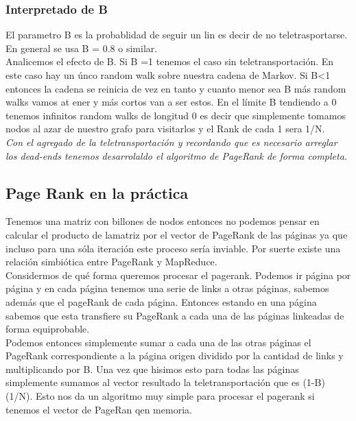 \documentclass[titlepage,a4paper]{article}
\begin{document}
\subsubsection*{Interpretado de B}
El parametro B es la probablidad de seguir un lin es decir de no teletrasportarse. En general se usa B = 0.8 o similar. \\

Analicemos el efecto de B. Si B =1 tenemos el caso sin teletransportación. En este caso hay un únco random walk sobre nuestra cadena de Markov. Si B<1 entonces la cadena se reinicia de vez en tanto y cuanto menor sea B más random walks vamos  at ener y más cortos van a ser estos. En el límite B tendiendo a 0 tenemos infinitos random walks de longitud 0 es decir que simplemente tomamos nodos al azar de nuestro grafo para visitarlos y el Rank de cada 1 sera 1/N. \\

\textit{Con el agregado de la teletransportación y recordando que es necesario arreglar los dead-ends tenemos desarrolaldo el algoritmo de PageRank de forma completa. }

\subsection*{Page Rank en la práctica}
Tenemos una matriz con billones de nodos entonces no podemos pensar en calcular el producto de lamatriz por el vector de PageRank de las páginas ya que incluso para una sóla iteración este proceso sería inviable. Por suerte existe una relación simbiótica entre PageRank y MapReduce. \\

Considermos de qué forma queremos procesar el pagerank. Podemos ir página por página y en cada página tenemos una serie de links a otras páginas, sabemos además que el pageRank de cada página. Entonces estando en una página sabemos que esta transfiere su PageRank a cada una de las páginas linkeadas de forma equiprobable. \\

Podemos entonces simplemente sumar a cada una de las otras páginas el PageRank correspondiente a la página origen dividido por la cantidad de links y multiplicando por B. Una vez que hisimos esto para todas las páginas simplemente sumamos al vector resultado la teletransportación que es (1-B)(1/N). Esto nos da un algoritmo muy simple para procesar el pagerank si tenemos el vector de PageRan qen memoria. \\ 
\end{document}
